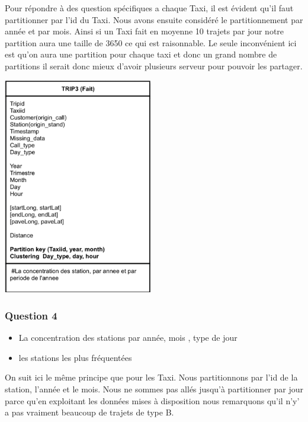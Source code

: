 \documentclass[]{report}
\begin{document}
	Pour répondre à des question spécifiques a chaque Taxi, il est évident qu’il faut partitionner par l'id du Taxi. Nous avons ensuite considéré le partitionnement par année et par mois. Ainsi si un Taxi fait en moyenne 10 trajets par jour notre partition aura une taille de 3650 ce qui est raisonnable. Le seule inconvénient ici est qu'on aura une partition pour chaque taxi et donc un grand nombre de partitions il serait donc mieux d'avoir plusieurs serveur pour pouvoir les partager.
	
	\begin{center}
		\includegraphics[width=65mm]{Figures/Trip3.png}
	\end{center}
	\subsubsection{Question 4}
	\begin{itemize}
		\item La concentration des stations par année, mois , type de jour
		\item  les stations les plus fréquentées
	\end{itemize}
	On suit ici le même principe que pour les Taxi. Nous partitionnons par l'id de la station, l'année et le mois. Nous ne sommes pas allés jusqu'à partitionner par  jour parce qu'en exploitant les données mises à disposition nous remarquons qu'il n'y' a pas vraiment beaucoup de trajets de type B.
	
\end{document}
